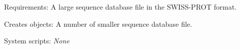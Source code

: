 \begin{description}
\begin{enumerate}
\begin{verbatim}
\end{verbatim}

\end{enumerate}


\item{Requirements:} A large sequence database file in the SWISS-PROT format.


\item{Creates objects:} A number of smaller sequence database file.


\item{System scripts:} {\em None}

\end{description}


